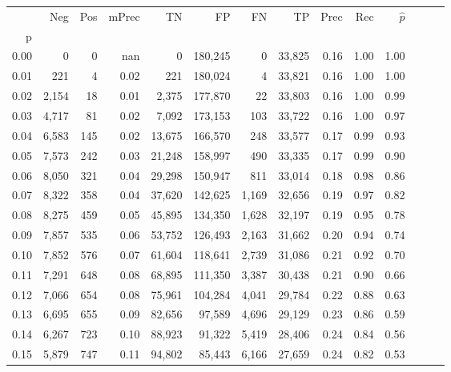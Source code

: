 \begin{tabular}{rrrrrrrrrrrrrr}
\toprule
{} &    Neg &  Pos & mPrec &       TN &       FP &      FN &      TP &  Prec &   Rec & $\hat{p}$ \\
p    &        &      &       &          &          &         &         &       &       &           \\
\midrule
0.00 &      0 &    0 &   nan &        0 &  180,245 &       0 &  33,825 &  0.16 &  1.00 &      1.00 \\
0.01 &    221 &    4 &  0.02 &      221 &  180,024 &       4 &  33,821 &  0.16 &  1.00 &      1.00 \\
0.02 &  2,154 &   18 &  0.01 &    2,375 &  177,870 &      22 &  33,803 &  0.16 &  1.00 &      0.99 \\
0.03 &  4,717 &   81 &  0.02 &    7,092 &  173,153 &     103 &  33,722 &  0.16 &  1.00 &      0.97 \\
0.04 &  6,583 &  145 &  0.02 &   13,675 &  166,570 &     248 &  33,577 &  0.17 &  0.99 &      0.93 \\
0.05 &  7,573 &  242 &  0.03 &   21,248 &  158,997 &     490 &  33,335 &  0.17 &  0.99 &      0.90 \\
0.06 &  8,050 &  321 &  0.04 &   29,298 &  150,947 &     811 &  33,014 &  0.18 &  0.98 &      0.86 \\
0.07 &  8,322 &  358 &  0.04 &   37,620 &  142,625 &   1,169 &  32,656 &  0.19 &  0.97 &      0.82 \\
0.08 &  8,275 &  459 &  0.05 &   45,895 &  134,350 &   1,628 &  32,197 &  0.19 &  0.95 &      0.78 \\
0.09 &  7,857 &  535 &  0.06 &   53,752 &  126,493 &   2,163 &  31,662 &  0.20 &  0.94 &      0.74 \\
0.10 &  7,852 &  576 &  0.07 &   61,604 &  118,641 &   2,739 &  31,086 &  0.21 &  0.92 &      0.70 \\
0.11 &  7,291 &  648 &  0.08 &   68,895 &  111,350 &   3,387 &  30,438 &  0.21 &  0.90 &      0.66 \\
0.12 &  7,066 &  654 &  0.08 &   75,961 &  104,284 &   4,041 &  29,784 &  0.22 &  0.88 &      0.63 \\
0.13 &  6,695 &  655 &  0.09 &   82,656 &   97,589 &   4,696 &  29,129 &  0.23 &  0.86 &      0.59 \\
0.14 &  6,267 &  723 &  0.10 &   88,923 &   91,322 &   5,419 &  28,406 &  0.24 &  0.84 &      0.56 \\
0.15 &  5,879 &  747 &  0.11 &   94,802 &   85,443 &   6,166 &  27,659 &  0.24 &  0.82 &      0.53 \\

\end{tabular}
